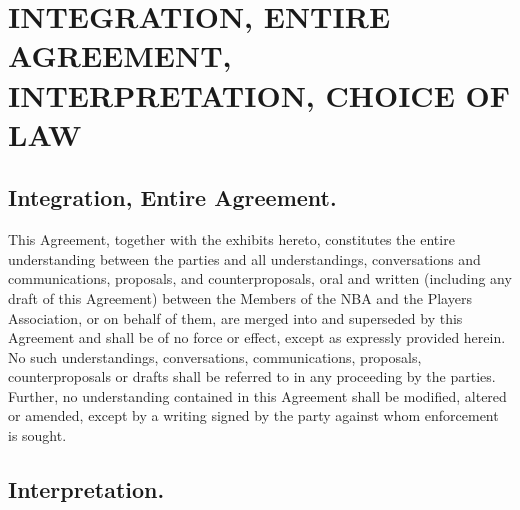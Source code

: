 \documentclass[
]{book}
\begin{document}
\hypertarget{integration-entire-agreement-interpretation-choice-of-law}{%
\chapter{INTEGRATION, ENTIRE AGREEMENT, INTERPRETATION, CHOICE OF LAW}\label{integration-entire-agreement-interpretation-choice-of-law}}


\hypertarget{integration-entire-agreement.}{%
\section{Integration, Entire Agreement.}\label{integration-entire-agreement.}}

This Agreement, together with the exhibits hereto, constitutes the entire understanding between the parties and all understandings, conversations and communications, proposals, and counterproposals, oral and written (including any draft of this Agreement) between the Members of the NBA and the Players Association, or on behalf of them, are merged into and superseded by this Agreement and shall be of no force or effect, except as expressly provided herein. No such understandings, conversations, communications, proposals, counterproposals or drafts shall be referred to in any proceeding by the parties. Further, no understanding contained in this Agreement shall be modified, altered or amended, except by a writing signed by the party against whom enforcement is sought.

\hypertarget{interpretation.}{%
\section{Interpretation.}\label{interpretation.}}
\end{document}
